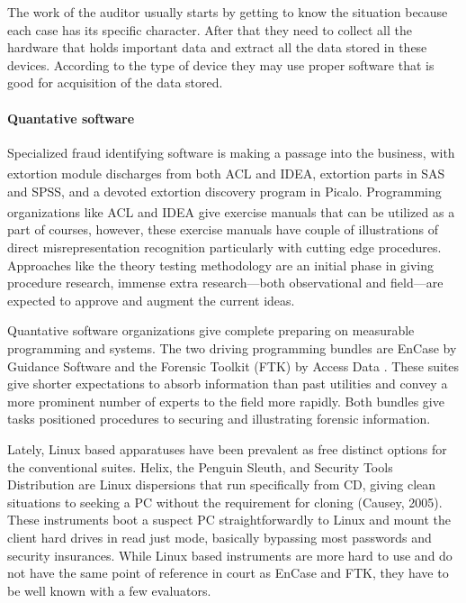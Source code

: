 {The work of the auditor usually starts by getting to know the situation because each case has its specific character. After that they need to collect all the hardware that holds important data and extract all the data stored in these devices. According to the type of device they may use proper software that is good for acquisition of the data stored.



\paragraph{Quantative software}\label{qSW}

Specialized fraud identifying software is making a passage into the business, with extortion module discharges from both ACL and IDEA\textsuperscript{\textregistered}, extortion parts in SAS and SPSS, and a devoted extortion discovery program in Picalo. Programming organizations like ACL and IDEA\textsuperscript{\textregistered} give exercise manuals that can be utilized as a part of courses, however, these exercise manuals have couple of illustrations of direct misrepresentation recognition particularly with cutting edge procedures. Approaches like the theory testing methodology are an initial phase in giving procedure research, immense extra research—both observational and field—are expected to approve and augment the current ideas.

Quantative software organizations give complete preparing on measurable programming and systems. The two driving programming bundles are EnCase by Guidance Software and the Forensic Toolkit (FTK) by Access Data . These suites give shorter expectations to absorb information than past utilities and convey a more prominent number of experts to the field more rapidly. Both bundles give tasks positioned procedures to securing and illustrating forensic information.


Lately, Linux based apparatuses have been prevalent as free distinct options for the conventional suites. Helix, the Penguin Sleuth, and Security Tools Distribution are Linux dispersions that run specifically from CD, giving clean situations to seeking a PC without the requirement for cloning (Causey, 2005). These instruments boot a suspect PC straightforwardly to Linux and mount the client hard drives in read just mode, basically bypassing most passwords and security insurances. While Linux based instruments are more hard to use and do not have the same point of reference in court as EnCase and FTK, they have to be well known with a few evaluators.


}
